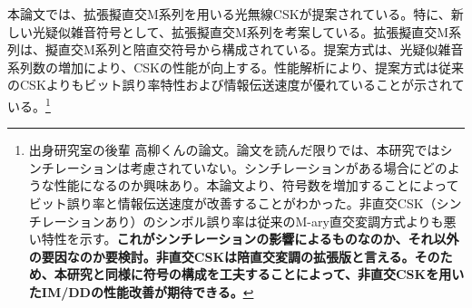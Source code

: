 ﻿\documentclass[a4j,10pt]{jarticle}
\begin{document}
\begin{enumerate}
本論文では、拡張擬直交M系列を用いる光無線CSKが提案されている。特に、新しい光疑似雑音符号として、拡張擬直交M系列を考案している。拡張擬直交M系列は、擬直交M系列と陪直交符号から構成されている。提案方式は、光疑似雑音系列数の増加により、CSKの性能が向上する。性能解析により、提案方式は従来のCSKよりもビット誤り率特性および情報伝送速度が優れていることが示されている。\footnote{出身研究室の後輩 高柳くんの論文。論文を読んだ限りでは、本研究ではシンチレーションは考慮されていない。シンチレーションがある場合にどのような性能になるのか興味あり。本論文より、符号数を増加することによってビット誤り率と情報伝送速度が改善することがわかった。非直交CSK（シンチレーションあり）のシンボル誤り率は従来のM-ary直交変調方式よりも悪い特性を示す。\bf{これがシンチレーションの影響によるものなのか、それ以外の要因なのか要検討}。非直交CSKは陪直交変調の拡張版と言える。そのため、\bf{本研究と同様に符号の構成を工夫することによって、非直交CSKを用いたIM/DDの性能改善が期待}できる。}
\end{enumerate}
\end{document}
